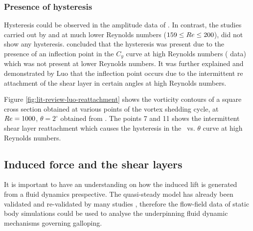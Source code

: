 \subsubsection*{Presence of hysteresis}

Hysteresis could be observed in the amplitude data of \cite{Parkinson1964}. In contrast, the studies carried out by \citet{Barrero-Gil2009} and \citet{Joly2012} at much lower Reynolds numbers ($159\leq Re\leq 200$), did not show any hysteresis. \citet{Luo2003} concluded that the hysteresis was present due to the presence of an inflection point in the $C_y$ curve at high Reynolds numbers (\citet{Parkinson1964} data) which was not present at lower Reynolds numbers. It was further explained and demonstrated by Luo that the inflection point occurs due to the intermittent re attachment of the shear layer in certain angles at high Reynolds numbers. 



Figure \ref{fig:lit-review-luo-reattachment} shows the vorticity contours of a square cross section obtained at various points of the vortex shedding cycle, at $Re=1000$, $\theta=2^{\circ}$ obtained from \citet{Luo2003}. The points 7 and 11 shows the intermittent shear layer reattachment which causes the hysteresis in the \cy\ vs. $\theta$ curve at high Reynolds numbers.

\vspace{20mm}   

\subsection{Induced force and the shear layers}
\label{subsec:c_y and shear layers}

It is important to have an understanding on how the induced lift is generated from a fluid dynamics prespective. The quasi-steady model has already been validated and re-validated by many studies \citep{Parkinson1964,Barrero-Gil2009,Luo2003}, therefore the flow-field data of static body simulations could be used to analyse the underpinning fluid dynamic mechanisms governing galloping.



